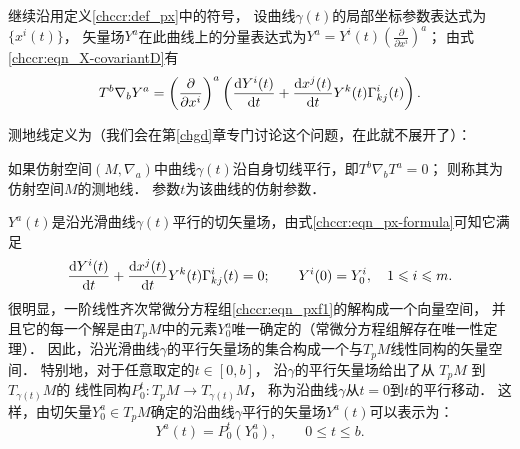 继续沿用定义\ref{chccr:def_px}中的符号，
设曲线$\gamma(t)$的局部坐标参数表达式为$\{x^i(t)\}$，
矢量场$Y^a$在此曲线上的分量表达式为$Y^a=Y^i(t)(\frac{\partial}{\partial x^i})^a$；
由式\eqref{chccr:eqn_X-covariantD}有
\begin{equation}\label{chccr:eqn_px-formula}
    T^b \nabla _b Y^a = \left(\frac{\partial}{\partial x^i}\right)^a
    \left(\frac{{\rm d} Y^i(t)}{{\rm d}t} +
    \frac{{\rm d}x^j(t)}{{\rm d} t} Y^k(t) \Gamma_{kj}^i(t) \right) .
\end{equation}

测地线定义为（我们会在第\ref{chgd}章专门讨论这个问题，在此就不展开了）：
\begin{definition}\label{chccr:def_geodesic}
如果仿射空间$(M,\nabla_a)$中曲线$\gamma(t)$沿自身切线平行，即$T^b \nabla _b T^a=0$；
则称其为仿射空间$M$的{\heiti 测地线}．  
参数$t$为该曲线的{\heiti 仿射参数}．
\end{definition}



$Y^a(t)$是沿光滑曲线$\gamma(t)$平行的切矢量场，由式\eqref{chccr:eqn_px-formula}可知它满足
\begin{equation}\label{chccr:eqn_pxf1}
    \frac{{\rm d} Y^i(t)}{{\rm d}t} +
    \frac{{\rm d}x^j(t)}{{\rm d} t} Y^k(t) \Gamma_{kj}^i(t) =0;
    \qquad Y^i(0)=Y^i_0,\quad 1\leqslant i \leqslant m.
\end{equation}
很明显，一阶线性齐次常微分方程组\eqref{chccr:eqn_pxf1}的解构成一个向量空间，
并且它的每一个解是由$T_p M$中的元素$Y^a_0$唯一确定的（常微分方程组解存在唯一性定理）．
因此，沿光滑曲线$\gamma$的平行矢量场的集合构成一个与$T_p M$线性同构的矢量空间．
特别地，对于任意取定的$t\in [0,b]$，
沿$\gamma$的平行矢量场给出了从 $T_p M$ 到 $T_{\gamma(t)} M$的
线性同构$P_0^t: T_p M \rightarrow T_{\gamma(t)} M$，
称为沿曲线$\gamma$从$t=0$到$t$的{\heiti 平行移动}．
这样，由切矢量$Y^a_0 \in T_p M$确定的沿曲线$\gamma$平行的矢量场$Y^a(t)$可以表示为：
\begin{equation}
    Y^a(t)=P_0^t \left(Y^a_0\right), \qquad 0 \leqslant t \leqslant b .
\end{equation}


